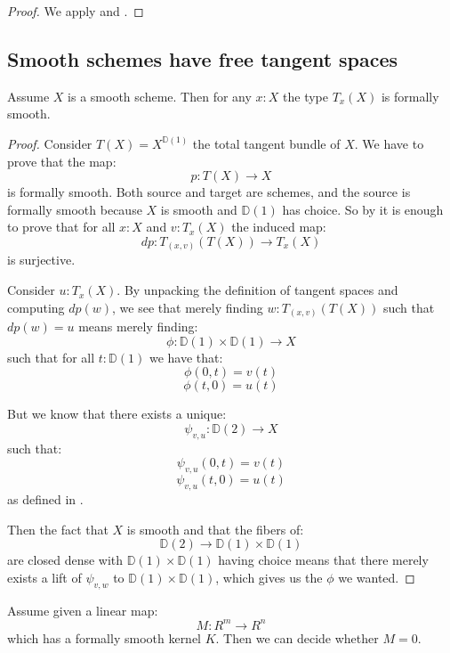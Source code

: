 \begin{proof}
We apply  and .
\end{proof}

\subsection{Smooth schemes have free tangent spaces}

\begin{lemma}\label{smooth-implies-smooth-tangent}
Assume $X$ is a smooth scheme. Then for any $x:X$ the type $T_x(X)$ is formally smooth.
\end{lemma}

\begin{proof}
Consider $T(X) = X^{\mathbb{D}(1)}$ the total tangent bundle of $X$. We have to prove that the map:
\[p:T(X)\to X\]
is formally smooth. Both source and target are schemes, and the source is formally smooth because $X$ is smooth and $\mathbb{D}(1)$ has choice. So by  it is enough to prove that for all $x:X$ and $v:T_x(X)$ the induced map:
\[dp:T_{(x,v)}(T(X))\to T_x(X)\]
is surjective. 

Consider $u:T_x(X)$. By unpacking the definition of tangent spaces and computing $dp(w)$, we see that merely finding $w:T_{(x,v)}(T(X))$ such that $dp(w) = u$ means merely finding:
\[\phi : \mathbb{D}(1) \times \mathbb{D}(1) \to X\]
such that for all $t:\mathbb{D}(1)$ we have that:
\[\phi(0,t) = v(t)\]
\[\phi(t,0) = u(t)\]

But we know that there exists a unique:
\[\psi_{v,u} : \mathbb{D}(2)\to X\]
such that:
\[\psi_{v,u}(0,t) = v(t)\]
\[\psi_{v,u}(t,0) = u(t)\]
as defined in .

Then the fact that $X$ is smooth and that the fibers of:
\[\mathbb{D}(2) \to\mathbb{D}(1) \times \mathbb{D}(1) \]
are closed dense with $\mathbb{D}(1) \times \mathbb{D}(1)$ having choice means that there merely exists a lift of $\psi_{v,w}$ to $\mathbb{D}(1) \times \mathbb{D}(1)$, which gives us the $\phi$ we wanted.
\end{proof}

\begin{lemma}\label{smooth-kernel-decidable}
Assume given a linear map:
\[M:R^m\to R^n\] 
which has a formally smooth kernel $K$. Then we can decide whether $M=0$.
\end{lemma}


